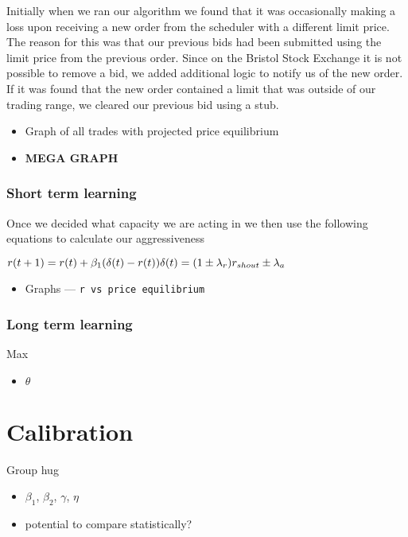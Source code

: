 \documentclass{acm_proc_article-sp}
\begin{document}
Initially when we ran our algorithm we found that it was occasionally making a
loss upon receiving a new order from the scheduler with a different limit
price. The reason for this was that our previous bids had been submitted using
the limit price from the previous order. Since on the Bristol Stock Exchange it
is not possible to remove a bid, we added additional logic to notify us of the
new order. If it was found that the new order contained a limit that was
outside of our trading range, we cleared our previous bid using a stub.

\begin{itemize} \itemsep0pt
	\item Graph of all trades with projected price equilibrium
	\item \textbf{MEGA GRAPH}
\end{itemize}


\subsubsection{Short term learning} \label{sec:AA_short_term_learning}
Once we decided what capacity we are acting in we then use the following
equations to calculate our aggressiveness

$r(t+1) = r(t) + \beta_1(\delta(t) - r(t))\\\delta(t) = (1 \pm
\lambda_r)r_{shout} \pm \lambda_a$
\begin{itemize} \itemsep0pt
	\item Graphs --- \tt r \rm vs price equilibrium
\end{itemize}

\subsubsection{Long term learning} \label{sec:AA_long_term_learning}
Max
\begin{itemize} \itemsep0pt
	\item $\theta$
\end{itemize}



\section{Calibration} \label{sec:calibration}
Group hug
\begin{itemize} \itemsep0pt
	\item $\beta_1$, $\beta_2$, $\gamma$, $\eta$
	\item potential to compare statistically?
\end{itemize}
\end{document}
